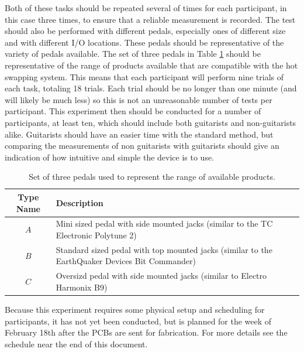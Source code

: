 \documentclass{article}
\begin{document}
	Both of these tasks should be repeated several of times for each participant, in this case three times, to ensure that a reliable measurement is recorded.  The test should also be performed with different pedals, especially ones of different size and with different I/O locations.  These pedals should be representative of the variety of pedals available.  The set of three pedals in Table \ref{tab:SwapTestPedals} should be representative of the range of products available that are compatible with the hot swapping system.  This means that each participant will perform nine trials of each task, totaling 18 trials.  Each trial should be no longer than one minute (and will likely be much less) so this is not an unreasonable number of tests per participant.  This experiment then should be conducted for a number of participants, at least ten, which should include both guitarists and non-guitarists alike.  Guitarists should have an easier time with the standard method, but comparing the measurements of non guitarists with guitarists should give an indication of how intuitive and simple the device is to use.  


	\begin{table}
	\begin{center}
	\begin{tabular}{ |c|p{8cm}| }
	\hline
	 Type Name & Description \\ 
	 \hline
	 $A$ & Mini sized pedal with side mounted jacks (similar to the TC Electronic Polytune 2) \\
	 $B$ & Standard sized pedal with top mounted jacks (similar to the EarthQuaker Devices Bit Commander) \\
	 $C$ & Oversizd pedal with side mounted jacks (similar to Electro Harmonix B9) \\
	 \hline
	\end{tabular}
	\caption{Set of three pedals used to represent the range of available products.}
	\label{tab:SwapTestPedals}
	\end{center}
	\end{table}

	Because this experiment requires some physical setup and scheduling for participants, it has not yet been conducted, but is planned for the week of February 18th after the PCBs are sent for fabrication.  For more details see the schedule near the end of this document.
\end{document}
